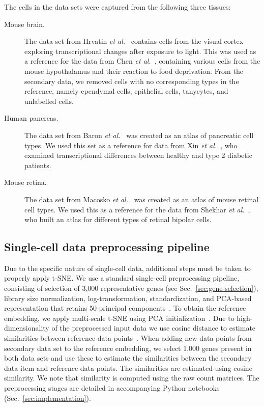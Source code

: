 \documentclass[runningheads]{llncs}
\newcommand{\etal}{\textit{et al.}}
\begin{document}
The cells in the data sets were captured from the following three tissues:
\begin{description}
\item[Mouse brain.] The data set from Hrvatin \etal~\cite{hrvatin2018} contains cells from the visual cortex exploring transcriptional changes after exposure to light. This was used as a reference for the data from Chen \etal~\cite{chen2017}, containing various cells from the mouse hypothalamus and their reaction to food deprivation. From the secondary data, we removed cells with no corresponding types in the reference, namely ependymal cells, epithelial cells, tanycytes, and unlabelled cells.

\item[Human pancreas.] The data set from Baron \etal~\cite{baron2016} was created as an atlas of pancreatic cell types. We used this set as a reference for data from Xin \etal~\cite{xin2016}, who examined transcriptional differences between healthy and type 2 diabetic patients.

\item[Mouse retina.] The data set from Macosko \etal~\cite{macosko2015} was created as an atlas of mouse retinal cell types. We used this as a reference for the data from Shekhar \etal~\cite{shekhar2016}, who built an atlas for different types of retinal bipolar cells.
\end{description}

\subsection{Single-cell data preprocessing pipeline}

Due to the specific nature of single-cell data, additional steps must be taken to properly apply t-SNE. We use a standard single-cell preprocessing pipeline, consisting of selection of 3,000 representative genes (see Sec.~\ref{sec:gene-selection}), library size normalization, log-transformation, standardization, and PCA-based representation that retains 50 principal components~\cite{seurat,scanpy}. To obtain the reference embedding, we apply multi-scale t-SNE using PCA initialization~\cite{art_of_using_tsne}. Due to high-dimensionality of the preprocessed input data we use cosine distance to estimate similarities between reference data points~\cite{Domingos2012-CACM}. When adding new data points from secondary data set to the reference embedding, we select 1,000 genes present in both data sets and use these to estimate the similarities between the secondary data item and reference data points. The similarities are estimated using cosine similarity. We note that similarity is computed using the raw count matrices. The preprocessing stages are detailed in accompanying Python notebooks (Sec.~\ref{sec:implementation}).
\end{document}
